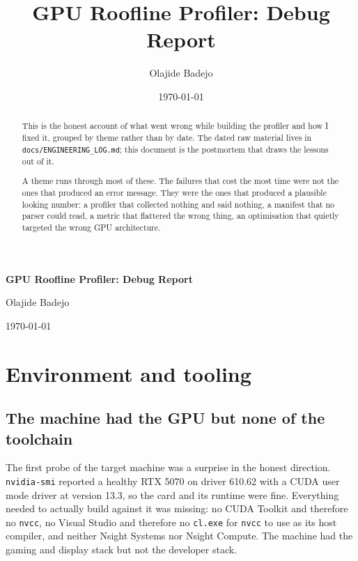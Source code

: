 ﻿\documentclass[11pt]{article}
\title{GPU Roofline Profiler: Debug Report}
\author{Olajide Badejo}
\date{\today}
\begin{document}
\begin{titlepage}
  \centering
  \vspace*{\fill}
  {\LARGE\bfseries GPU Roofline Profiler: Debug Report\par}
  \vspace*{\fill}
  {\large Olajide Badejo\par}
  \vspace{0.9em}
  {\large \today\par}
  \vspace{1.5cm}
\end{titlepage}

\begin{abstract}
This is the honest account of what went wrong while building the profiler and
how I fixed it, grouped by theme rather than by date. The dated raw material
lives in \texttt{docs/\allowbreak ENGINEERING\_LOG.md}; this document is the
postmortem that draws the lessons out of it.

A theme runs through most of these. The failures that cost the most time were not
the ones that produced an error message. They were the ones that produced a
plausible looking number: a profiler that collected nothing and said nothing, a
manifest that no parser could read, a metric that flattered the wrong thing, an
optimisation that quietly targeted the wrong GPU architecture.
\end{abstract}
\clearpage

\tableofcontents
\clearpage

\section{Environment and tooling}

\subsection{The machine had the GPU but none of the toolchain}

The first probe of the target machine was a surprise in the honest direction.
\texttt{nvidia-smi} reported a healthy RTX 5070 on driver 610.62 with a CUDA user
mode driver at version 13.3, so the card and its runtime were fine. Everything
needed to actually build against it was missing: no CUDA Toolkit and therefore no
\texttt{nvcc}, no Visual Studio and therefore no \texttt{cl.exe} for \texttt{nvcc}
to use as its host compiler, and neither Nsight Systems nor Nsight Compute. The
machine had the gaming and display stack but not the developer stack.
\end{document}
